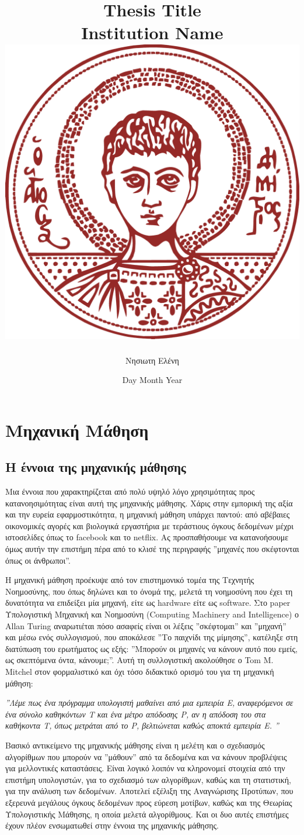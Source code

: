 \documentclass[11pt]{report}
\title{
	{Thesis Title}\\
	{\large Institution Name}\\
	{\includegraphics{auth}}
}
\author{Νησιωτη Ελένη}
\date{Day Month Year}
\begin{document}
\maketitle
%

\section{Μηχανική Μάθηση}
\subsection{Η έννοια της μηχανικής μάθησης}
Μια έννοια που χαρακτηρίζεται από πολύ υψηλό λόγο χρησιμότητας προς κατανοησιμότητας είναι αυτή της μηχανικής μάθησης. Χάρις στην εμπορική της αξία και την ευρεία εφαρμοστικότητα, η μηχανική μάθηση υπάρχει παντού: από αβέβαιες οικονομικές αγορές και βιολογικά εργαστήρια με τεράστιους όγκους δεδομένων μέχρι ιστοσελίδες όπως το facebook και το netflix. Ας προσπαθήσουμε να κατανοήσουμε όμως αυτήν την επιστήμη πέρα από το κλισέ της περιγραφής ”μηχανές που σκέφτονται όπως οι άνθρωποι”.

Η μηχανική μάθηση προέκυψε από τον επιστημονικό τομέα της Τεχνητής Νοημοσύνης, που όπως δηλώνει και το όνομά της, μελετά τη νοημοσύνη που έχει τη δυνατότητα να επιδείξει μία μηχανή, είτε ως hardware είτε ως software. Στο paper Υπολογιστική Μηχανική και Νοημοσύνη (Computing Machinery and Intelligence) ο Allan Turing αναρωτιέται πόσο ασαφείς είναι οι λέξεις ”σκέφτομαι” και ”μηχανή” και μέσω ενός συλλογισμού, που αποκάλεσε ”Το παιχνίδι της μίμησης”, κατέληξε στη διατύπωση του ερωτήματος ως εξής: ”Μπορούν οι μηχανές να κάνουν αυτό που εμείς, ως σκεπτόμενα όντα, κάνουμε;”. Αυτή τη συλλογιστική ακολούθησε ο Tom M. Mitchel στον φορμαλιστικό και όχι τόσο διδακτικό ορισμό του για τη μηχανική μάθηση:

\textit{”Λέμε πως ένα πρόγραμμα υπολογιστή μαθαίνει από μια εμπειρία Ε, αναφερόμενοι σε ένα σύνολο καθηκόντων Τ και ένα μέτρο απόδοσης P, αν η απόδοση του στα καθήκοντα T, όπως μετράται από το P, βελτιώνεται καθώς αποκτά εμπειρία Ε. ”}

Βασικό αντικείμενο της μηχανικής μάθησης είναι η μελέτη και ο σχεδιασμός αλγορίθμων που μπορούν να ”μάθουν” από τα δεδομένα και να κάνουν προβλέψεις για μελλοντικές καταστάσεις. Είναι λογικό λοιπόν να κληρονομεί στοιχεία από την επιστήμη υπολογιστών, για το σχεδιασμό των αλγορίθμων, καθώς και τη στατιστική, για την ανάλυση των δεδομένων. Αποτελεί εξέλιξη της Αναγνώρισης Προτύπων, που εξερευνά μεγάλους όγκους δεδομένων προς εύρεση μοτίβων, καθώς και της Θεωρίας Υπολογιστικής Μάθησης, η οποία μελετά αλγορίθμους. Και οι δυο αυτές επιστήμες έχουν πλέον ενσωματωθεί στην έννοια της μηχανικής μάθησης.
\end{document}
